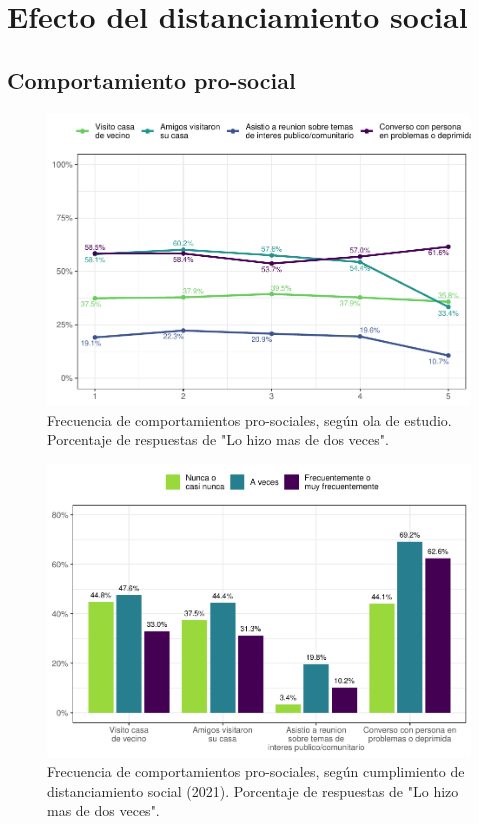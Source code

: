 \documentclass[
  12pt,
]{book}
\begin{document}
\hypertarget{efecto-del-distanciamiento-social}{%
\section{Efecto del distanciamiento social}\label{efecto-del-distanciamiento-social}}

\hypertarget{comportamiento-pro-social}{%
\subsection{Comportamiento pro-social}\label{comportamiento-pro-social}}

\begin{figure}

{\centering \includegraphics{reporte-elsoc_files/figure-latex/dist-pros-1} 

}

\caption{Frecuencia de comportamientos pro-sociales, según ola de estudio. Porcentaje de respuestas de "Lo hizo mas de dos veces".}\label{fig:dist-pros}
\end{figure}
\begin{figure}

{\centering \includegraphics{reporte-elsoc_files/figure-latex/dist-pros2-1} 

}

\caption{Frecuencia de comportamientos pro-sociales, según cumplimiento de distanciamiento social (2021). Porcentaje de respuestas de "Lo hizo mas de dos veces".}\label{fig:dist-pros2}
\end{figure}
\end{document}
